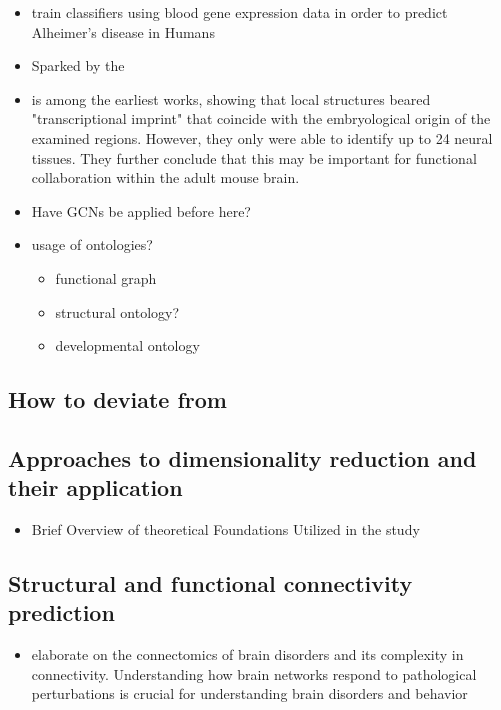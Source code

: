 \documentclass[]{article}
\renewcommand{\cite}{\citep}
\begin{document}
\begin{itemize}
	\item \cite{lee2020prediction} train classifiers using blood gene expression data in order to predict Alheimer's disease in Humans
	\item Sparked by the \citet{MouseBrainAtlas}
	\item \cite{zapala2005adult} is among the earliest works, showing that local structures beared "transcriptional imprint" that coincide with the embryological origin of the examined regions. However, they only were able to identify up to 24 neural tissues. They further conclude that this may be important for functional collaboration within the adult mouse brain.
\end{itemize}
\begin{itemize}
	\item Have GCNs be applied before here?
	\item usage of ontologies?
	\begin{itemize}
		\item functional graph \cite{ValkShapingBrainStructure2020}
		\item structural ontology?
		\item developmental ontology
	\end{itemize}
\end{itemize}

\subsection*{How to deviate from \cite{Partel2020}}

\subsection{Approaches to dimensionality reduction and their application}
\begin{itemize}
	\item Brief Overview of theoretical Foundations Utilized in the study
\end{itemize}

\subsection{Structural and functional connectivity prediction}

\begin{itemize}
	\item \cite{fornito2015connectomics} elaborate on the connectomics of brain disorders and its complexity in connectivity. Understanding how brain networks respond to pathological perturbations is crucial for understanding brain disorders and behavior
\end{itemize}
\end{document}
